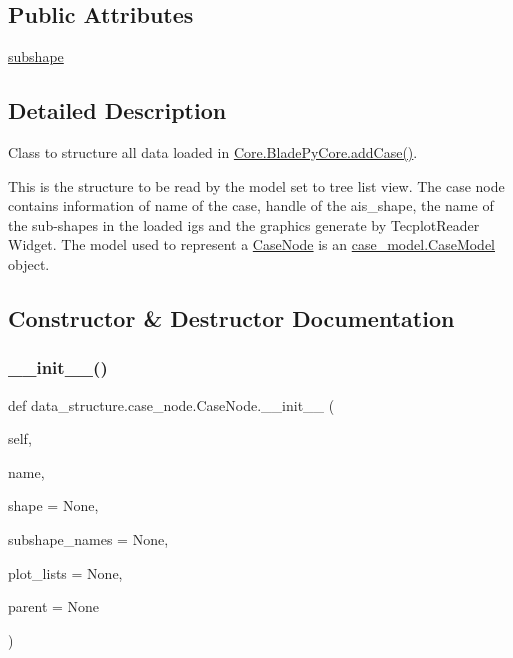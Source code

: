\subsection*{Public Attributes}
\begin{DoxyCompactItemize}
\item 
\hyperlink{a00086_ac2f5b0ae9715edeac8f9b1ccc0fd64e3}{subshape}
\end{DoxyCompactItemize}


\subsection{Detailed Description}
Class to structure all data loaded in \hyperlink{a00078_a1a62f9b5b8f5929bdb6f0a8c27049d9e}{Core.\+Blade\+Py\+Core.\+add\+Case()}. 

This is the structure to be read by the model set to tree list view. The case node contains information of name of the case, handle of the ais\+\_\+shape, the name of the sub-\/shapes in the loaded igs and the graphics generate by Tecplot\+Reader Widget. The model used to represent a \hyperlink{a00086}{Case\+Node} is an \hyperlink{a00082}{case\+\_\+model.\+Case\+Model} object. 

\subsection{Constructor \& Destructor Documentation}
\hypertarget{a00086_a268359dc0ff12ae9d60b0311f4d20a12}{}\label{a00086_a268359dc0ff12ae9d60b0311f4d20a12} 
\subsubsection{\texorpdfstring{\+\_\+\+\_\+init\+\_\+\+\_\+()}{\_\_init\_\_()}}
{\footnotesize\ttfamily def data\+\_\+structure.\+case\+\_\+node.\+Case\+Node.\+\_\+\+\_\+init\+\_\+\+\_\+ (\begin{DoxyParamCaption}\item[{}]{self,  }\item[{}]{name,  }\item[{}]{shape = {\ttfamily None},  }\item[{}]{subshape\+\_\+names = {\ttfamily None},  }\item[{}]{plot\+\_\+lists = {\ttfamily None},  }\item[{}]{parent = {\ttfamily None} }\end{DoxyParamCaption})}



